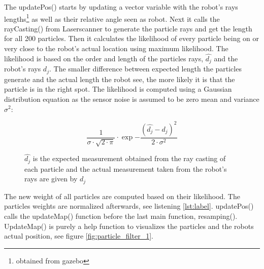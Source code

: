 \documentclass[../../../Main.tex]{subfiles}
\begin{document}
The updatePos() starts by updating a vector variable with the robot's rays lengths\footnote{obtained from gazebo} as well as their relative angle seen as robot.
Next it calls the rayCasting() from Laserscanner to generate the particle rays and get the length for all 200 particles.
Then it calculates the likelihood of every particle being on or very close to the robot's actual location using maximum likelihood. The likelihood is based on the order and length of the particles rays, $\widehat{d_j}$ and the robot's rays $d_j$.
The smaller difference between expected length the particles generate and the actual length the robot see, the more likely it is that the particle is in the right spot.
The likelihood is computed using a Gaussian distribution equation as the sensor noise is assumed to be zero mean and variance $\sigma^{2}$:
\begin{figure}[H]
  \begin{equation}
      \dfrac{1}{\sigma \cdot \sqrt{2 \cdot \pi}} \cdot \exp{- \dfrac{(\widehat{d_j}-d_j)^{2}}{2 \cdot \sigma ^2  }}
  \end{equation}
  \caption{$\widehat{d_j}$ is the expected measurement obtained from the ray casting of each particle and the actual measurement taken from the robot's rays are given by $d_j$ \cite{Guassian}}
\end{figure}
The new weight of all particles are computed based on their likelihood.
The particles weights are normalized afterwards, see listening \ref{lst:label}. updatePos() calls the updateMap() function before the last main function, resamping(). UpdateMap() is purely a help function to visualizes the particles and the robots actual position, see figure \ref{fig:particle_filter_1}.
\end{document}
